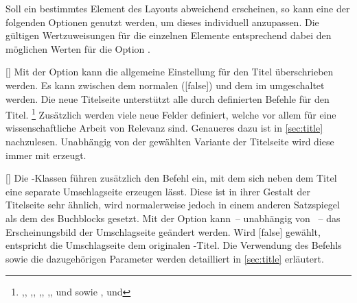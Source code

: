 \begin{Declaration*}{}
\begin{Declaration*}{}
\begin{Declaration*}{}
Soll ein bestimmtes Element des Layouts abweichend erscheinen, so kann eine der 
folgenden Optionen genutzt werden, um dieses individuell anzupassen. Die 
gültigen Wertzuweisungen für die einzelnen Elemente entsprechend dabei den 
möglichen Werten für die Option .

\begin{Declaration}{[\PSet]}
\printdeclarationlist%
%
%
Mit der Option  kann die allgemeine Einstellung für den Titel 
überschrieben werden. Es kann zwischen dem normalen ([false]) 
und dem im \CD umgeschaltet werden. Die neue Titelseite unterstützt alle durch 
\KOMAScript{} definierten Befehle für den Titel.%
\footnote{\raggedright%
  ,,
  ,,
  ,,
  ,,
   und  sowie
  ,
  und 
}
Zusätzlich werden viele neue Felder definiert, welche vor allem für eine 
wissenschaftliche Arbeit von Relevanz sind. Genaueres dazu 
ist in \autoref{sec:title} nachzulesen. Unabhängig von der gewählten Variante 
der Titelseite wird diese immer mit  erzeugt.
\end{Declaration}

\begin{Declaration}{[\PSet]}
\printdeclarationlist%
%
%
Die \TUDScript-Klassen führen zusätzlich den Befehl  ein, mit 
dem sich neben dem Titel eine separate Umschlagseite erzeugen lässt. Diese ist 
in ihrer Gestalt der Titelseite sehr ähnlich, wird normalerweise jedoch in 
einem anderen Satzspiegel als dem des Buchblocks gesetzt. Mit der Option 
 kann~-- unabhängig von ~-- das Erscheinungsbild 
der Umschlagseite geändert werden. Wird [false] gewählt, 
entspricht die Umschlagseite dem originalen \KOMAScript-Titel. Die Verwendung 
des Befehls  sowie die dazugehörigen Parameter werden 
detailliert in \autoref{sec:title} erläutert.
\end{Declaration}


\end{Declaration*}
\end{Declaration*}
\end{Declaration*}
